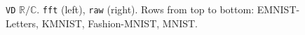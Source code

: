 \documentclass[a4paper,10pt,onecolumn]{article}
\newcommand{\real}{\mathbb{R}}
\newcommand{\cplx}{\mathbb{C}}
\begin{document}
\begin{figure}[b]
\begin{subfigure}[b]{0.5\columnwidth}
  \end{subfigure}
  \caption{%
    \texttt{VD} $\real / \cplx$.
      \texttt{fft} (left), \texttt{raw} (right).
      Rows from top to bottom: EMNIST-Letters, KMNIST, Fashion-MNIST, MNIST.
  }
\end{figure}
\end{document}
